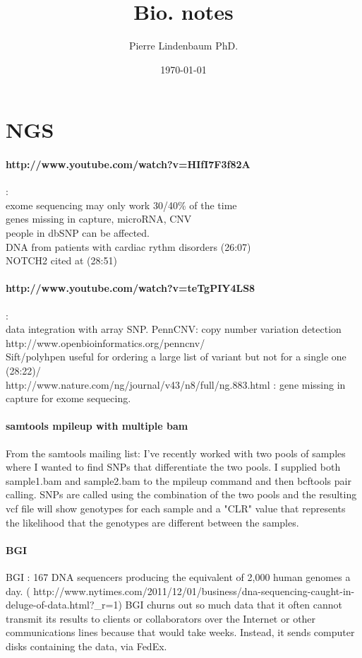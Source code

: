 \documentclass[12pt]{article}
\title{Bio. notes}
\author{Pierre Lindenbaum PhD.}
\date{\today}
\begin{document}
\maketitle
\section{NGS}
\paragraph{http://www.youtube.com/watch?v=HIfI7F3f82A}:\\

exome sequencing may only work 30/40\% of the time\\
genes missing in capture, microRNA, CNV\\
people in dbSNP can be affected.\\
DNA from patients with cardiac rythm disorders (26:07) \\
NOTCH2 cited at (28:51)\\

\paragraph{http://www.youtube.com/watch?v=teTgPIY4LS8}:\\

data integration with array SNP.
PennCNV: copy number variation detection http://www.openbioinformatics.org/penncnv/\\
Sift/polyhpen useful for ordering a large list of variant but not for a single one (28:22)/ \\
http://www.nature.com/ng/journal/v43/n8/full/ng.883.html : gene missing in capture for exome sequecing.\\

\paragraph{samtools mpileup with multiple bam}
From the samtools mailing list: I've recently worked with two pools of samples where I wanted to find SNPs that differentiate the two pools.  I supplied both sample1.bam and sample2.bam to the mpileup command and then bcftools pair calling.  SNPs are called using the combination of the two pools and the resulting vcf file will show genotypes for each sample and a "CLR" value that represents the likelihood that the genotypes are different between the samples.

\paragraph{BGI}
BGI : 167 DNA sequencers producing the equivalent of 2,000 human genomes a day. ( http://www.nytimes.com/2011/12/01/business/dna-sequencing-caught-in-deluge-of-data.html?_r=1) 
BGI churns out so much data that it often cannot transmit its results to clients or collaborators over the Internet or other communications lines because that would take weeks. Instead, it sends computer disks containing the data, via FedEx. 
\end{document}
